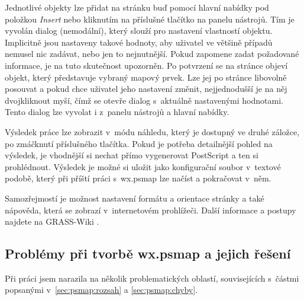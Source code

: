 \documentclass[a4paper,12pt,draft]{article}
\begin{document}
Jednotlivé objekty lze přidat na stránku buď pomocí hlavní nabídky
pod polož\-kou \emph{Insert} nebo kliknutím na příslušné tlačítko na
panelu nástrojů. Tím je vyvolán dialog (nemodální), který slouží
pro nastavení vlastností objektu. Implicitně jsou nastaveny takové
hodnoty, aby uživatel ve většině případů nemusel nic zadávat, nebo
jen to nejnutnější. Pokud zapomene zadat požadované informace, je na
tuto skutečnost upozorněn. Po potvrzení se na stránce objeví objekt,
který představuje vybraný mapový prvek. Lze jej po stránce libovolně
posouvat a pokud chce uživatel jeho nastavení změnit, nejjednodušší je
na něj dvojkliknout myší, čímž se otevře dialog s~aktuálně nastavenými
hodnotami. Tento dialog lze vyvolat i z~panelu nástrojů a hlavní nabídky.

Výsledek práce lze zobrazit v~módu náhledu, který je dostupný ve
druhé záložce, po zmáčknutí příslušného tlačítka. Pokud je
potřeba detailnější pohled na výsledek, je vhodnější si nechat přímo
vygenerovat PostScript a ten si prohlédnout. Výsledek je možné si uložit
jako konfigurační soubor v~textové podobě, který při příští práci
s~wx.psmap lze načíst a pokračovat v~něm.

Samozřejmostí je možnost nastavení formátu a orientace stránky a
také nápo\-věda, která se zobrazí v~internetovém prohlížeči. Další
informace a postupy najdete na GRASS-Wiki \cite{wiki_wxpsmap}. 


\subsection[Problémy při tvorbě wx.psmap]{Problémy při tvorbě wx.psmap
a jejich řešení}
\label{sec:gui:problemy}
Při práci jsem narazila na několik problematických oblastí,
 souvisejících s~částmi popsanými v~\ref{sec:psmap:rozsah} a
\ref{sec:psmap:chyby}.
\end{document}

